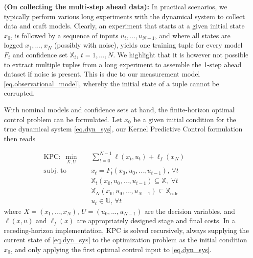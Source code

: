 \begin{remark}
	\textbf{(On collecting the multi-step ahead data):}
	In practical scenarios, we typically perform various long experiments with the dynamical system to collect data and craft models. Clearly, an experiment that starts at a given initial state $x_0$, is followed by a sequence of inputs $u_t,\dots,u_{N-1}$, and where all states are logged $x_1,\dots,x_{N}$ (possibly with noise), yields one training tuple for every model $F_t$ and confidence set $\mathbb{X}_t$, $t=1,\dots,N$. We highlight that it is however not possible to extract multiple tuples from a long experiment to assemble the 1-step ahead dataset if noise is present. This is due to our measurement model \eqref{eq.observational_model}, whereby the initial state of a tuple cannot be corrupted.
\end{remark}

With nominal models and confidence sets at hand, the finite-horizon optimal control problem can be formulated. Let $x_0$ be a given initial condition for the true dynamical system \eqref{eq.dyn_sys}, our Kernel Predictive Control formulation then reads

\begin{subequations}
	\begin{align}
		\text{KPC}: \; \min_{X,U} & \quad \sum_{t=0}^{N-1} \ell (x_t,u_t) + \ell_f (x_N) \\
		\text{subj. to} & \quad x_{t} = F_{t}(x_0,u_0,\dots,u_{t-1}), \, \forall t \label{eq.KPCnominal} \\
		& \quad \mathbb{X}_t(x_0,u_0,\dots,u_{t-1}) \subseteq \mathbb{X}, \; \forall t \hspace{2cm} \label{eq.setContrs1} \\
		& \quad \mathbb{X}_N(x_0,u_0,\dots,u_{N-1}) \subseteq \mathbb{X}_{\text{safe}} \label{eq.setContrs2} \\
		& \quad u_t \in \mathbb{U}, \, \forall t 
	\end{align}
	\label{eq.KPC}%
\end{subequations}
where $X = (x_1,\dots,x_N)$, $U = (u_0,\dots,u_{N-1})$ are the decision variables, and $\ell(x,u)$ and $\ell_f(x)$ are appropriately designed stage and final costs. In a receding-horizon implementation, KPC is solved recursively, always supplying the current state of \eqref{eq.dyn_sys} to the optimization problem as the initial condition $x_0$, and only applying the first optimal control input to \eqref{eq.dyn_sys}.

